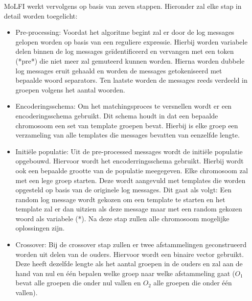 MoLFI werkt vervolgens op basis van zeven stappen. Hieronder zal elke stap in detail worden toegelicht:
\begin{itemize}
    \item Pre-processing: Voordat het algoritme begint zal er door de log messages gelopen worden op basis van een reguliere expressie. Hierbij worden variabele delen binnen de log messages geïdentificeerd en vervangen met een token (*pre*) die niet meer zal gemuteerd kunnen worden. Hierna worden dubbele log messages eruit gehaald en worden de messages getokeniseerd met bepaalde woord separators. Ten laatste worden de messages reeds verdeeld in groepen volgens het aantal woorden.\\
    \item Encoderingsschema: Om het matchingsproces te versnellen wordt er een encoderingsschema gebruikt. Dit schema houdt in dat een bepaalde chromosoom een set van template groepen bevat. Hierbij is elke groep een verzameling van alle templates die messages bevatten van eenzelfde lengte.\\
    \item Initiële populatie: Uit de pre-processed messages wordt de initiële populatie opgebouwd. Hiervoor wordt het encoderringsschema gebruikt. Hierbij wordt ook een bepaalde grootte van de populatie meegegeven. Elke chromosoom zal met een lege groep starten. Deze wordt aangevuld met templates die worden opgesteld op basis van de originele log messages. Dit gaat als volgt: Een random log message wordt gekozen om een template te starten en het template zal er dan uitzien als deze message maar met een random gekozen woord als variabele (*). Na deze stap zullen alle chromosoom mogelijke oplossingen zijn.\\
    \item Crossover: Bij de crossover stap zullen er twee afstammelingen geconstrueerd worden uit delen van de ouders. Hiervoor wordt een binaire vector gebruikt. Deze heeft dezelfde lengte als het aantal groepen in de ouders en zal aan de hand van nul en één bepalen welke groep naar welke afstammeling gaat ($O_{1}$ bevat alle groepen die onder nul vallen en $O_{2}$ alle groepen die onder één vallen).\\

\end{itemize}
